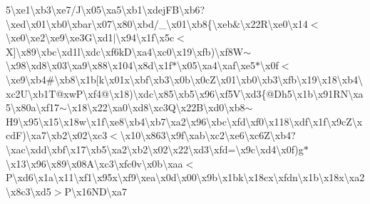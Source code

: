 5\textbackslash{}xe1\textbackslash{}xb3\textbackslash{}xe7/\+J\textbackslash{}x05\textbackslash{}xa5\textbackslash{}xb1\textbackslash{}xdej\+F\+B\textbackslash{}xb6?\textbackslash{}xed\textbackslash{}x01\textbackslash{}xb0\textbackslash{}xbar\textbackslash{}x07\textbackslash{}x80\textbackslash{}xbd/\+\_\+\textbackslash{}x01\textbackslash{}xb8\{\textbackslash{}xeb\&\textbackslash{}x22\+R\textbackslash{}xe0\textbackslash{}x14$<$\textbackslash{}xe0\textbackslash{}xe2\textbackslash{}xe9\textbackslash{}xe3\+G\textbackslash{}xd1$\vert$\textbackslash{}x94\textbackslash{}x1f\textbackslash{}x5c$<$\+X\mbox{]}\textbackslash{}x89\textbackslash{}xbc\textbackslash{}xd1l\textbackslash{}xdc\textbackslash{}xf6k\+D\textbackslash{}xa4\textbackslash{}xc0\textbackslash{}x19\textbackslash{}xfb)\textbackslash{}xf8\+W$\sim$\textbackslash{}x98\textbackslash{}xd8\textbackslash{}x03\textbackslash{}xa9\textbackslash{}x88\textbackslash{}x104\textbackslash{}x8d\textbackslash{}x1f$\ast$\textbackslash{}x05\textbackslash{}xa4\textbackslash{}xaf\textbackslash{}xe5$\ast$\textbackslash{}x0f$<$\textbackslash{}xe9\textbackslash{}xb4\#\textbackslash{}xb8\textbackslash{}x1b\mbox{[}k\textbackslash{}x01x\textbackslash{}xbf\textbackslash{}xb3\textbackslash{}x0b\textbackslash{}x0c\+Z\textbackslash{}x01\textbackslash{}xb0\textbackslash{}xb3\textbackslash{}xfb\textbackslash{}x19\textbackslash{}x18\textbackslash{}xb4\textbackslash{}xc2\+U\textbackslash{}xb1\+T@xw\+P\textbackslash{}xf4@\textbackslash{}x18)\textbackslash{}xdc\textbackslash{}x85\textbackslash{}xb5\textbackslash{}x96\textbackslash{}xf5\+V\textbackslash{}xd3\{@\+Dh5\textbackslash{}x1b\textbackslash{}x91\textquotesingle{}\+R\+N\textbackslash{}xa5\textbackslash{}x80a\textbackslash{}xf17$\sim$\textbackslash{}x18\textbackslash{}x22\textbackslash{}xa0\textbackslash{}xd8\textbackslash{}xc3\+Q\textbackslash{}x22\+B\textbackslash{}xd0\textbackslash{}xb8$\sim$\+H9\textbackslash{}x95\textbackslash{}x15\textbackslash{}x18w\textbackslash{}x1f\textbackslash{}xe8\textbackslash{}xb4\textbackslash{}xb7\textbackslash{}xa2\textbackslash{}x96\textbackslash{}xbc\textbackslash{}xfd\textbackslash{}xf0\textbackslash{}x118\textbackslash{}xdf\textbackslash{}x1f\textbackslash{}x9c\textquotesingle{}\+Z\textbackslash{}xcd\+F)\textbackslash{}xa7\textbackslash{}xb2\textbackslash{}x02\textbackslash{}xc3$<$\textbackslash{}x10\textbackslash{}x863\textbackslash{}x9f\textbackslash{}xab\textbackslash{}xc2\textbackslash{}xe6\textbackslash{}xc6\+Z\textbackslash{}xb4?\textbackslash{}xac\textbackslash{}xdd\textbackslash{}xbf\textbackslash{}x17\textbackslash{}xb5\textbackslash{}xa2\textbackslash{}xb2\textbackslash{}x02\textbackslash{}x22\textbackslash{}xd3\textbackslash{}xfd=\textbackslash{}x9c\textbackslash{}xd4\textbackslash{}x0f)g$\ast$\textbackslash{}x13\textbackslash{}x96\textbackslash{}x89\textbackslash{}x08\+A\textbackslash{}xc3\textbackslash{}xfc0v\textbackslash{}x0b\textbackslash{}xaa$<$\+P\textbackslash{}xd6\textbackslash{}x1a\textbackslash{}x11\textbackslash{}xf1\textbackslash{}x95x\textbackslash{}xf9\textbackslash{}xea\textbackslash{}x0d\textbackslash{}x00\textbackslash{}x9b\textbackslash{}x1bk\textbackslash{}x18cx\textbackslash{}xfdn\textbackslash{}x1b\textbackslash{}x18x\textbackslash{}xa2\textbackslash{}x8c3\textbackslash{}xd5$>$\+P\textbackslash{}x16\+N\+D\textbackslash{}xa7\textbacks